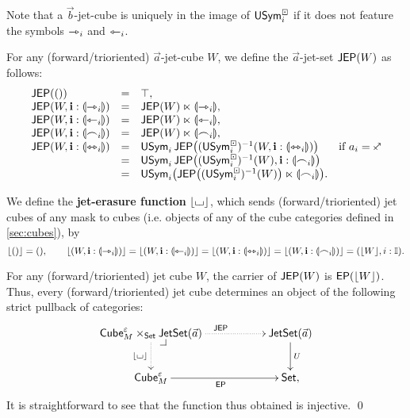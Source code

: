 \documentclass[a4paper]{memoir}
\begin{document}
Note that a $\vec b$-jet-cube is uniquely in the image of $\mathsf{USym}^\boxdot_i$ if it does not feature the symbols $\rightarrowtriangle_i$ and $\leftarrowtriangle_i$.
\begin{definition} \label{def:jep}
	For any (forward/trioriented) $\vec a$-jet-cube $W$, we define the $\vec a$-jet-set $\mathsf{JEP}(W)$ as follows:
	\[ \begin{array}{l c l l}
		\JEP(()) &=& \top, \\
		\JEP(W, \dm i : \rival{\jet_i}) &=& \JEP(W) \multip \rival{\jet_i}, \\
		\JEP(W, \dm i : \rival{\tej_i}) &=& \JEP(W) \multip \rival{\tej_i}, \\
		\JEP(W, \dm i : \rival{\edge_i}) &=& \JEP(W) \multip \rival{\edge_i}, \\
		\JEP(W, \dm i : \rival{\equijet_i}) &=& \Usym_i \, \JEP\paren{(\Usymcube_i)\inv(W, \dm i : \rival{\equijet_i})}
		& \text{if $a_i = \ypolar$} \\
		&=& \Usym_i \, \JEP\paren{(\Usymcube_i)\inv(W), \dm i : \rival{\edge_i}} \\
		&=& \Usym_i\paren{\JEP\paren{(\Usymcube_i)\inv(W)} \multip \rival{\edge_i}}.
	\end{array} \]
\end{definition}
\begin{definition} \label{def:jet-cube-erasure}
	We define the \textbf{jet-erasure function} $\mathopen{}\left\lfloor {\llcorner\hspace{-.4ex}\lrcorner} \right\rfloor\mathclose{}$, which sends (forward/trioriented) jet cubes of any mask to cubes (i.e. objects of any of the cube categories defined in \cref{sec:cubes}), by
	\[
		\mathopen{}\left\lfloor () \right\rfloor\mathclose{} = (),
		\qquad
		\mathopen{}\left\lfloor (W, \mathbf{i} : {\llparenthesis \rightarrowtriangle_i \rrparenthesis}) \right\rfloor\mathclose{} =
		\mathopen{}\left\lfloor (W, \mathbf{i} : {\llparenthesis \leftarrowtriangle_i \rrparenthesis}) \right\rfloor\mathclose{} =
		\mathopen{}\left\lfloor (W, \mathbf{i} : {\llparenthesis \leftrightarrowtriangle_i \rrparenthesis}) \right\rfloor\mathclose{} =
		\mathopen{}\left\lfloor (W, \mathbf{i} : {\llparenthesis \frown_i \rrparenthesis}) \right\rfloor\mathclose{} =
		(\mathopen{}\left\lfloor W \right\rfloor\mathclose{}, i : {\mathbb I}).
	\]
\end{definition}
\begin{corollary} \label{thm:jet-cube-pullback}
	For any (forward/trioriented) jet cube $W$, the carrier of $\mathsf{JEP}(W)$ is $\mathsf{EP}(\mathopen{}\left\lfloor W \right\rfloor\mathclose{})$.
	Thus, every (forward/trioriented) jet cube determines an object of the following strict pullback of categories:
	\[
			\xymatrix{
				\cubecat^\eps_M \times_\Set \jetset{\vec a}
					\ar@{.>}[rr]^{\JEP}
					\ar@{.>}[d]_{\erasejc{\loch}}
					\xydrcorner
				&&
				\jetset{\vec a}
					\ar[d]^U
				\\
				\cubecat^\eps_M
					\ar[rr]_{\EP}
				&&
				\Set,
			}
	\]
	It is straightforward to see that the function thus obtained is injective. \qed
\end{corollary}
\end{document}
